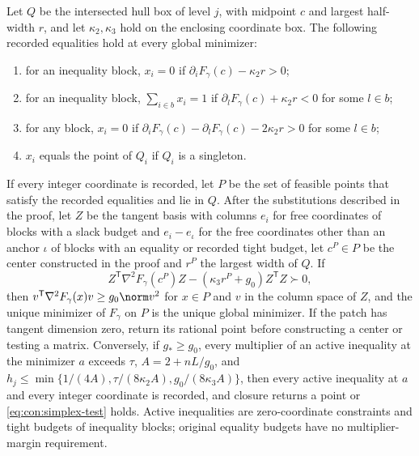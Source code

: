 \begin{lemma}\label{lem:con:simplex-close}
Let $Q$ be the intersected hull box of level $j$, with midpoint $c$ and
largest half-width $r$, and let $\kappa_2,\kappa_3$ hold on the enclosing
coordinate box. The following recorded equalities hold at every global
minimizer:
\begin{enumerate}[label=(\alph*)]
\item for an inequality block, $x_i=0$ if $\partial_iF_\gamma(c)-\kappa_2r>0$;
\item for an inequality block, $\sum_{i\in b}x_i=1$ if
$\partial_lF_\gamma(c)+\kappa_2r<0$ for some $l\in b$;
\item for any block, $x_i=0$ if
$\partial_iF_\gamma(c)-\partial_lF_\gamma(c)-2\kappa_2r>0$ for some $l\in b$;
\item $x_i$ equals the point of $Q_i$ if $Q_i$ is a singleton.
\end{enumerate}
If every integer coordinate is recorded, let $P$ be the set of feasible
points that satisfy the recorded equalities and lie in $Q$. After the
substitutions described in the proof, let $Z$ be the tangent basis with
columns $e_i$ for free coordinates of blocks with a slack budget and
$e_i-e_{\iota}$ for the free coordinates other than an anchor $\iota$ of blocks
with an equality or recorded tight budget, let $c^P\in P$ be the center
constructed in the proof and $r^P$ the largest width of $Q$. If
\begin{equation}\label{eq:con:simplex-test}
 Z^{\mathsf T}\nabla^2F_\gamma(c^P)Z-(\kappa_3r^P+g_0)Z^{\mathsf T}Z\succ0,
\end{equation}
then $v^{\mathsf T}\nabla^2F_\gamma(x)v\ge g_0\norm v^2$ for $x\in P$ and $v$ in
the column space of $Z$, and the unique minimizer of $F_\gamma$ on $P$ is the
unique global minimizer. If the patch has tangent dimension zero, return
its rational point before constructing a center or testing a matrix.
Conversely, if $g_*\ge g_0$, every multiplier of an
active inequality at the minimizer $a$ exceeds $\tau$, $A=2+nL/g_0$, and
$h_j\le\min\{1/(4A),\tau/(8\kappa_2A),g_0/(8\kappa_3A)\}$, then every active
inequality at $a$ and every integer coordinate is recorded, and closure
returns a point or \eqref{eq:con:simplex-test} holds. Active inequalities
are zero-coordinate constraints and tight budgets of inequality blocks;
original equality budgets have no multiplier-margin requirement.
\end{lemma}

